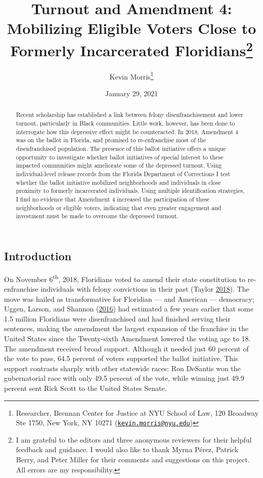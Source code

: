 \documentclass[
  12pt,
]{article}
\title{Turnout and Amendment 4: Mobilizing Eligible Voters Close to Formerly Incarcerated Floridians\thanks{I am grateful to the editors and three anonymous reviewers for their helpful feedback and guidance. I would also like to thank Myrna Pérez, Patrick Berry, and Peter Miller for their comments and suggestions on this project. All errors are my responsibility.}}
\author{Kevin Morris\footnote{Researcher, Brennan Center for Justice at NYU School of Law, 120 Broadway Ste 1750, New York, NY 10271 (\href{mailto:kevin.morris@nyu.edu}{\nolinkurl{kevin.morris@nyu.edu}})}}
\date{January 29, 2021}
\begin{document}
\maketitle
\begin{abstract}
Recent scholarship has established a link between felony disenfranchisement and lower turnout, particularly in Black communities. Little work, however, has been done to interrogate how this depressive effect might be counteracted. In 2018, Amendment 4 was on the ballot in Florida, and promised to re-enfranchise most of the disenfranchised population. The presence of this ballot initiative offers a unique opportunity to investigate whether ballot initiatives of special interest to these impacted communities might ameliorate some of the depressed turnout. Using individual-level release records from the Florida Department of Corrections I test whether the ballot initiative mobilized neighborhoods and individuals in close proximity to formerly incarcerated individuals. Using multiple identification strategies, I find no evidence that Amendment 4 increased the participation of these neighborhoods or eligible voters, indicating that even greater engagement and investment must be made to overcome the depressed turnout.
\end{abstract}

\pagebreak

\doublespacing

\hypertarget{introduction}{%
\subsection*{Introduction}\label{introduction}}

On November 6\textsuperscript{th}, 2018, Floridians voted to amend their state constitution to re-enfranchise individuals with felony convictions in their past (Taylor \protect\hyperlink{ref-Taylor2018}{2018}). The move was hailed as transformative for Floridian --- and American --- democracy; Uggen, Larson, and Shannon (\protect\hyperlink{ref-sentencing_2016}{2016}) had estimated a few years earlier that some 1.5 million Floridians were disenfranchised and had finished serving their sentences, making the amendment the largest expansion of the franchise in the United States since the Twenty-sixth Amendment lowered the voting age to 18. The amendment received broad support. Although it needed just 60 percent of the vote to pass, 64.5 percent of voters supported the ballot initiative. This support contrasts sharply with other statewide races: Ron DeSantis won the gubernatorial race with only 49.5 percent of the vote, while winning just 49.9 percent sent Rick Scott to the United States Senate.
\end{document}
